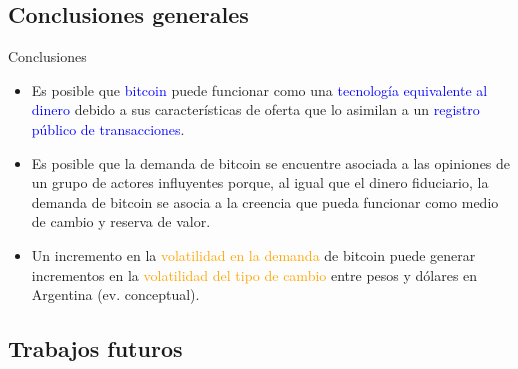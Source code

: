 \subsection{Conclusiones generales}

\begin{frame}{Conclusiones}

\begin{itemize}
    \item[] Es posible que \textcolor{blue}{bitcoin} puede funcionar como una \textcolor{blue}{tecnología equivalente al dinero} debido a sus características de oferta que lo asimilan a un \textcolor{blue}{registro público de transacciones}. 
    \vspace{5mm}
    \item[] Es posible que la \textcolor{dgreen}{demanda de bitcoin} se encuentre asociada a las opiniones de un grupo de \textcolor{dgreen}{actores influyentes} porque, al igual que el dinero fiduciario, la demanda de bitcoin se asocia a la \textcolor{dgreen}{creencia} que pueda funcionar como medio de cambio y reserva de valor.
    \vspace{5mm}
    \item[] Un incremento en la  \textcolor{orange}{volatilidad en la demanda} de bitcoin puede generar incrementos en la \textcolor{orange}{volatilidad del tipo de cambio} entre pesos y dólares en Argentina (ev. conceptual).
    \end{itemize}
    
    
\end{frame}

\subsection{Trabajos futuros}

